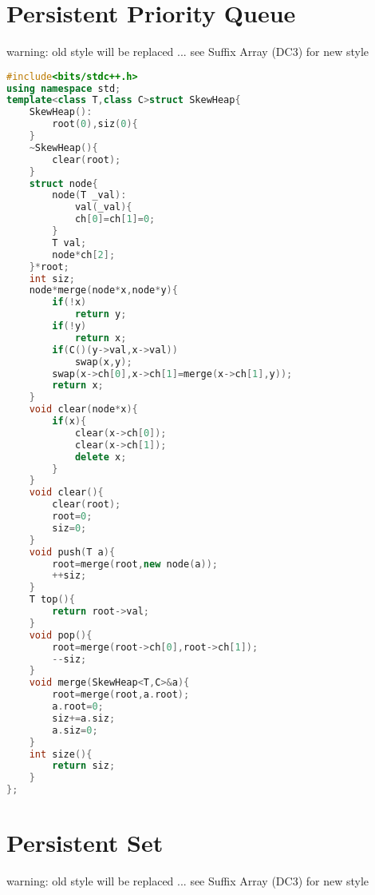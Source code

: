 \documentclass{book}
\begin{document}
\section{Persistent Priority Queue}
warning: old style will be replaced ... see Suffix Array (DC3) for new style\begin{lstlisting}[language=C++,title={Persistent Priority Queue.hpp (1220 bytes, 61 lines)}]
#include<bits/stdc++.h>
using namespace std;
template<class T,class C>struct SkewHeap{
    SkewHeap():
        root(0),siz(0){
    }
    ~SkewHeap(){
        clear(root);
    }
    struct node{
        node(T _val):
            val(_val){
            ch[0]=ch[1]=0;
        }
        T val;
        node*ch[2];
    }*root;
    int siz;
    node*merge(node*x,node*y){
        if(!x)
            return y;
        if(!y)
            return x;
        if(C()(y->val,x->val))
            swap(x,y);
        swap(x->ch[0],x->ch[1]=merge(x->ch[1],y));
        return x;
    }
    void clear(node*x){
        if(x){
            clear(x->ch[0]);
            clear(x->ch[1]);
            delete x;
        }
    }
    void clear(){
        clear(root);
        root=0;
        siz=0;
    }
    void push(T a){
        root=merge(root,new node(a));
        ++siz;
    }
    T top(){
        return root->val;
    }
    void pop(){
        root=merge(root->ch[0],root->ch[1]);
        --siz;
    }
    void merge(SkewHeap<T,C>&a){
        root=merge(root,a.root);
        a.root=0;
        siz+=a.siz;
        a.siz=0;
    }
    int size(){
        return siz;
    }
};
\end{lstlisting}
\section{Persistent Set}
warning: old style will be replaced ... see Suffix Array (DC3) for new style\begin{lstlisting}[language=C++,title={Persistent Set.hpp (0 bytes, 0 lines)}]
\end{lstlisting}
\end{document}
